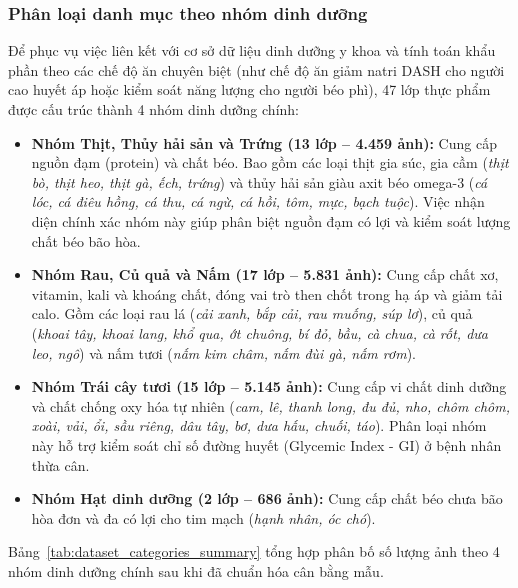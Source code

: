 \subsubsection{Phân loại danh mục theo nhóm dinh dưỡng}
Để phục vụ việc liên kết với cơ sở dữ liệu dinh dưỡng y khoa và tính toán khẩu phần theo các chế độ ăn chuyên biệt (như chế độ ăn giảm natri DASH cho người cao huyết áp hoặc kiểm soát năng lượng cho người béo phì), 47 lớp thực phẩm được cấu trúc thành 4 nhóm dinh dưỡng chính:
\begin{itemize}[leftmargin=0.8cm, label=\textbullet, itemsep=2pt, topsep=2pt]
    \item \textbf{Nhóm Thịt, Thủy hải sản và Trứng (13 lớp -- 4.459 ảnh):} Cung cấp nguồn đạm (protein) và chất béo. Bao gồm các loại thịt gia súc, gia cầm (\textit{thịt bò, thịt heo, thịt gà, ếch, trứng}) và thủy hải sản giàu axit béo omega-3 (\textit{cá lóc, cá điêu hồng, cá thu, cá ngừ, cá hồi, tôm, mực, bạch tuộc}). Việc nhận diện chính xác nhóm này giúp phân biệt nguồn đạm có lợi và kiểm soát lượng chất béo bão hòa.
    \item \textbf{Nhóm Rau, Củ quả và Nấm (17 lớp -- 5.831 ảnh):} Cung cấp chất xơ, vitamin, kali và khoáng chất, đóng vai trò then chốt trong hạ áp và giảm tải calo. Gồm các loại rau lá (\textit{cải xanh, bắp cải, rau muống, súp lơ}), củ quả (\textit{khoai tây, khoai lang, khổ qua, ớt chuông, bí đỏ, bầu, cà chua, cà rốt, dưa leo, ngô}) và nấm tươi (\textit{nấm kim châm, nấm đùi gà, nấm rơm}).
    \item \textbf{Nhóm Trái cây tươi (15 lớp -- 5.145 ảnh):} Cung cấp vi chất dinh dưỡng và chất chống oxy hóa tự nhiên (\textit{cam, lê, thanh long, đu đủ, nho, chôm chôm, xoài, vải, ổi, sầu riêng, dâu tây, bơ, dưa hấu, chuối, táo}). Phân loại nhóm này hỗ trợ kiểm soát chỉ số đường huyết (Glycemic Index - GI) ở bệnh nhân thừa cân.
    \item \textbf{Nhóm Hạt dinh dưỡng (2 lớp -- 686 ảnh):} Cung cấp chất béo chưa bão hòa đơn và đa có lợi cho tim mạch (\textit{hạnh nhân, óc chó}).
\end{itemize}

Bảng~\ref{tab:dataset_categories_summary} tổng hợp phân bố số lượng ảnh theo 4 nhóm dinh dưỡng chính sau khi đã chuẩn hóa cân bằng mẫu.

